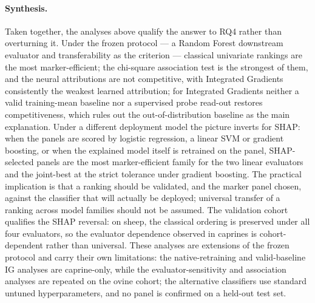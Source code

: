 \paragraph{Synthesis.}
Taken together, the analyses above qualify the answer to RQ4 rather
than overturning it. Under the frozen protocol --- a Random Forest
downstream evaluator and transferability as the criterion --- classical
univariate rankings are the most marker-efficient; the chi-square
association test is the strongest of them, and the neural attributions
are not competitive, with Integrated Gradients consistently the weakest
learned attribution; for Integrated Gradients neither a valid
training-mean baseline nor a supervised probe read-out restores
competitiveness, which rules out the out-of-distribution baseline as
the main explanation. Under a different deployment model the picture
inverts for SHAP: when the panels are scored by logistic regression, a
linear SVM or gradient boosting, or when the explained model itself is
retrained on the panel, SHAP-selected panels are the most
marker-efficient family for the two linear evaluators and the joint-best
at the strict tolerance under gradient boosting. The practical implication is that a ranking
should be validated, and the marker panel chosen, against the
classifier that will actually be deployed; universal transfer of a
ranking across model families should not be assumed. The validation
cohort qualifies the SHAP reversal: on sheep, the classical ordering is
preserved under all four evaluators, so the evaluator dependence
observed in caprines is cohort-dependent rather than universal. These
analyses are
extensions of the frozen protocol and carry their own limitations: the
native-retraining and valid-baseline IG analyses are caprine-only,
while the evaluator-sensitivity and association analyses are repeated
on the ovine cohort; the alternative classifiers use standard untuned
hyperparameters, and no panel is confirmed on a held-out test set.

